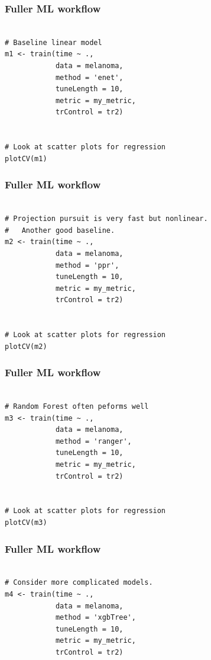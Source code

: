 \documentclass[handout, aspectratio = 169]{beamer}
\begin{document}
\begin{frame}[fragile]
\frametitle{Fuller ML workflow}
\begin{Verbatim}

# Baseline linear model
m1 <- train(time ~ ., 
            data = melanoma,
            method = 'enet',
            tuneLength = 10,
            metric = my_metric,
            trControl = tr2)


# Look at scatter plots for regression
plotCV(m1)

\end{Verbatim}

\end{frame} 



\begin{frame}[fragile]
\frametitle{Fuller ML workflow}
\begin{Verbatim}

# Projection pursuit is very fast but nonlinear.
#   Another good baseline.
m2 <- train(time ~ ., 
            data = melanoma,
            method = 'ppr',
            tuneLength = 10,
            metric = my_metric,
            trControl = tr2)


# Look at scatter plots for regression
plotCV(m2)

\end{Verbatim}

\end{frame} 


\begin{frame}[fragile]
\frametitle{Fuller ML workflow}
\begin{Verbatim}

# Random Forest often peforms well
m3 <- train(time ~ ., 
            data = melanoma,
            method = 'ranger',
            tuneLength = 10,
            metric = my_metric,
            trControl = tr2)


# Look at scatter plots for regression
plotCV(m3)
\end{Verbatim}

\end{frame} 


\begin{frame}[fragile]
\frametitle{Fuller ML workflow}
\begin{Verbatim}

# Consider more complicated models.
m4 <- train(time ~ ., 
            data = melanoma,
            method = 'xgbTree',
            tuneLength = 10,
            metric = my_metric,
            trControl = tr2)

\end{Verbatim}

\end{frame} 
\end{document}
